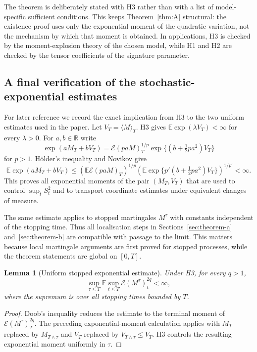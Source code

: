\documentclass[11pt,oneside]{article}
\theoremstyle{plain}
\newtheorem{lemma}[theorem]{Lemma}
\theoremstyle{definition}
\theoremstyle{remark}
\newcommand{\R}{\mathbb{R}}
\newcommand{\E}{\mathbb{E}}
\begin{document}
The theorem is deliberately stated with H3 rather than with a list of model-specific sufficient conditions. This keeps Theorem~\ref{thm:A} structural: the existence proof uses only the exponential moment of the quadratic variation, not the mechanism by which that moment is obtained. In applications, H3 is checked by the moment-explosion theory of the chosen model, while H1 and H2 are checked by the tensor coefficients of the signature parameter.


\subsection{A final verification of the stochastic-exponential estimates}
\label{subsec:final-exponential-verification}
For later reference we record the exact implication from H3 to the two uniform estimates used in the paper. Let $V_T=\langle M\rangle_T$. H3 gives $\E\exp(\lambda V_T)<\infty$ for every $\lambda>0$. For $a,b\in\R$ write
\[
\exp(aM_T+bV_T)=\mathcal E(paM)_T^{1/p}
\exp\{(b+\tfrac12pa^2)V_T\}
\]
for $p>1$. H\"older's inequality and Novikov give
\[
\E\exp(aM_T+bV_T)
\leq
\left(\E\mathcal E(paM)_T\right)^{1/p}
\left(\E\exp\{p'(b+\tfrac12pa^2)V_T\}\right)^{1/p'}<\infty .
\]
This proves all exponential moments of the pair $(M_T,V_T)$ that are used to control $\sup_t S_t^2$ and to transport coordinate estimates under equivalent changes of measure.

The same estimate applies to stopped martingales $M^{\tau}$ with constants independent of the stopping time. Thus all localisation steps in Sections~\ref{sec:theorem-a} and~\ref{sec:theorem-b} are compatible with passage to the limit. This matters because local martingale arguments are first proved for stopped processes, while the theorem statements are global on $[0,T]$.

\begin{lemma}[Uniform stopped exponential estimate]
\label{lem:uniform-stopped-exponential}
Under H3, for every $q>1$,
\[
\sup_{\tau\leq T}\E\sup_{t\leq T}\mathcal E(M^{\tau})_t^{2q}<\infty,
\]
where the supremum is over all stopping times bounded by $T$.
\end{lemma}

\begin{proof}
Doob's inequality reduces the estimate to the terminal moment of $\mathcal E(M^{\tau})_T^{2q}$. The preceding exponential-moment calculation applies with $M_T$ replaced by $M_{T\wedge\tau}$ and $V_T$ replaced by $V_{T\wedge\tau}\leq V_T$. H3 controls the resulting exponential moment uniformly in $\tau$.
\end{proof}
\end{document}
